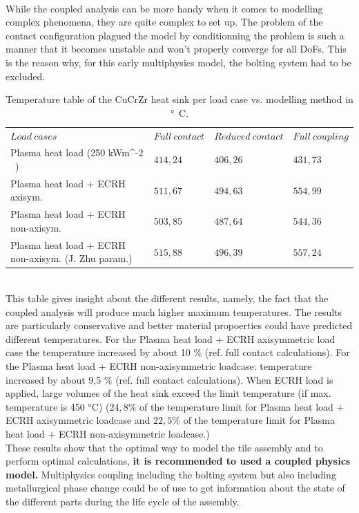 \\
\break
\normalsize{\indent While the coupled analysis can be more handy when it comes to modelling complex phenomena, they are quite complex to set up. The problem of the contact configuration plagued the model by conditionning the problem is such a manner that it becomes unstable and won't properly converge for all \acrshort{DoF}s. This is the reason why, for this early multiphysics model, the bolting system had to be excluded.}
\\
\begin{table}[h!]
    \centering
    \begin{tabular}{p{}p{2cm}p{}p{2cm} }
    \toprule
    $Load \ cases$ & $Full \ contact$ & $Reduced \ contact$ & $Full \ coupling$ \\
    \cmidrule{1-4}

    Plasma heat load (250 \unit{kWm^{-2} }) & $414,24$ & $406,26$ & $431,73$\\
    \myrowcolour
    Plasma heat load + \acrshort{ECRH} axisym. & $511,67$ & $494,63$ & $554,99$\\
    Plasma heat load + \acrshort{ECRH} non-axisym. & $503,85$ & $487,64$ & $544,36$\\
    \myrowcolour
    Plasma heat load + \acrshort{ECRH} non-axisym. (J. Zhu param.) & $515,88$ & $496,39$ & $557,24$\\

\bottomrule
\end{tabular}
\caption{Temperature table of the \acrshort{CuCrZr} heat sink per load case vs. modelling method in \unit{\si{\degree}C}. }
\end{table}
\\
\normalsize{\indent This table gives insight about the different results, namely, the fact that the coupled analysis will produce much higher maximum temperatures. The results are particularly conservative and better material propoerties could have predicted different temperatures. For the Plasma heat load + \acrshort{ECRH} axisymmetric load case the temperature increased by about 10 \% (ref. full contact calculations). For the Plasma heat load + \acrshort{ECRH} non-axisymmetric loadcase: temperature increased by about 9,5 \% (ref. full contact calculations). When \acrshort{ECRH} load is applied, large volumes of the heat sink exceed the limit temperature (if max. temperature is 450 \si{\degree}C) ($24,8 \%$ of the temperature limit for Plasma heat load + \acrshort{ECRH} axisymmetric loadcase and $22,5 \%$ of the temperature limit for Plasma heat load + \acrshort{ECRH} non-axisymmetric loadcase.) }
\\
\break
\normalsize{These results show that the optimal way to model the tile assembly and to perform optimal calculations, {\bfseries it is recommended to used a coupled physics model.} Multiphysics coupling including the bolting system but also including metallurgical phase change could be of use to get information about the state of the different parts during the life cycle of the assembly.}